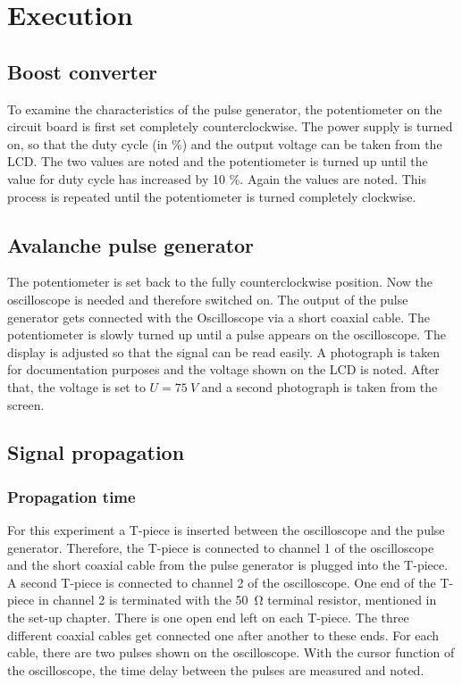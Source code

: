 \chapter{Execution}
    \section{Boost converter}
        To examine the characteristics of the pulse generator, the potentiometer on the circuit board is first set completely
        counterclockwise. The power supply is turned on, so that the duty cycle (in \%) and the output voltage can be taken from
        the LCD. The two values are noted and the potentiometer is turned up until the value for duty cycle has increased by 10 \%.
        Again the values are noted. This process is repeated until the potentiometer is turned completely clockwise.
    \section{Avalanche pulse generator}
        The potentiometer is set back to the fully counterclockwise position. Now the oscilloscope is needed and therefore
        switched on. The output of the pulse generator gets connected with the Oscilloscope via a short coaxial cable. The
        potentiometer is slowly turned up until a pulse appears on the oscilloscope. The display is adjusted so that the signal
        can be read easily. A photograph is taken for documentation purposes and the voltage shown on the LCD is noted. After
        that, the voltage is set to \(U = \SI{75}{V}\) and a second photograph is taken from the screen.
    \section{Signal propagation}
        \subsection{Propagation time}
            For this experiment a T-piece is inserted between the oscilloscope and the pulse generator. Therefore, the T-piece is
            connected to channel 1 of the oscilloscope and the short coaxial cable from the pulse generator is plugged into the
            T-piece. A second T-piece is connected to channel 2 of the oscilloscope. One end of the T-piece in channel 2 is terminated
            with the \SI{50}{\ohm} terminal resistor, mentioned in the set-up chapter. There is one open end left on each T-piece.
            The three different coaxial cables get connected one after another to these ends. For each cable, there are two pulses
            shown on the oscilloscope. With the cursor function of the oscilloscope, the time delay between the pulses are measured
            and noted.
